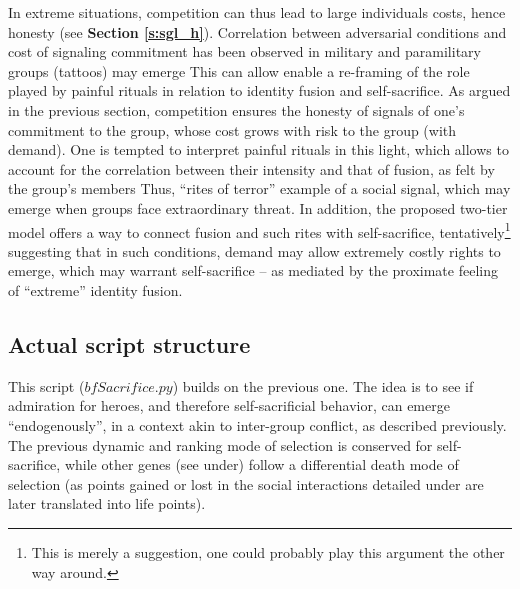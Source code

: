 \documentclass[a4paper,12pt]{report}
\begin{document}
In extreme situations, competition can thus lead to large individuals costs,
hence honesty (see \textbf{Section \ref{s:sgl_h}}). Correlation between adversarial conditions and
cost of signaling commitment has been observed in military and paramilitary groups
(tattoos) may emerge %
This can allow enable a re-framing of the role played by painful rituals in
relation to identity fusion and self-sacrifice. As argued in the previous section,
competition ensures the honesty of signals of one’s commitment to the group, whose
cost grows with risk to the group (with demand). One is tempted to interpret painful
rituals in this light, which allows to account for the correlation between their
intensity and that of fusion, as felt by the group’s members %
Thus, “rites of terror” %
example of a social signal, which may emerge when groups face extraordinary threat.
In addition, the proposed two-tier model offers a way to connect fusion and such rites
with self-sacrifice, tentatively\footnote{
    This is merely a suggestion, one could probably play this argument
    the other way around.}
suggesting that in such conditions, demand may allow
extremely costly rights to emerge, which may warrant self-sacrifice – as mediated by
the proximate feeling of “extreme” identity fusion.












\subsection{Actual script structure}
This script ($bf{Sacrifice.py}$) builds on the previous one.
The idea is to see if admiration for heroes, and therefore self-sacrificial behavior,
can emerge “endogenously”, in a context akin to inter-group conflict,
as described previously. The previous dynamic and ranking mode of selection
is conserved for self-sacrifice, while other genes (see under) follow a differential
death mode of selection (as points gained or lost in the social interactions detailed
under are later translated into life points).
\end{document}
